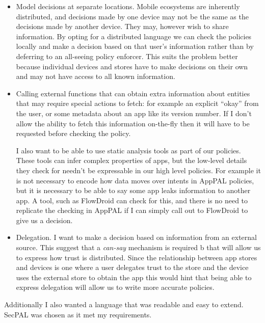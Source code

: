 \documentclass[thesis.tex]{subfiles}
\begin{document}
\begin{itemize}
  \item Model decisions at separate locations.  Mobile ecosystems are
    inherently distributed, and decisions made by one device may not be
    the same as the decisions made by another device.  They may, however
    wish to share information.  By opting for a distributed language we
    can check the policies locally and make a decision based on that
    user's information rather than by deferring to an all-seeing policy
    enforcer.  This suits the problem better because individual devices
    and stores have to make decisions on their own and may not have access
    to all known information.

  \item Calling external functions that can obtain extra information
    about entities that may require special actions to fetch: for example
    an explicit ``okay'' from the user, or some metadata about an app like
    its version number.  If I don't allow the ability to fetch this
    information on-the-fly then it will have to be requested before
    checking the policy.

    I also want to be able to use static analysis tools as part of
    our policies.  These tools can infer complex properties of apps, but
    the low-level details they check for needn't be expressable in our
    high level policies.  For example it is not necessary to encode how
    data moves over intents in AppPAL policies, but it is necessary to be
    able to say some app leaks information to another app.  A tool, such
    as FlowDroid can check for this, and there is no need to replicate the
    checking in AppPAL if I can simply call out to FlowDroid to give us a
    decision.

  \item Delegation.  I want to make a decision based on information from an
    external source.  This suggest that a \emph{can-say} mechanism is required
    b
    that will allow us to express how trust is distributed.   Since the
    relationship between app stores and devices is one where a user delegates
    trust to the store and the device uses the external store to obtain the app
    this would hint that being able to express delegation will allow us to write
    more accurate policies.
\end{itemize}

Additionally I also wanted a language that was readable and easy to extend.
SecPAL was chosen as it met my requirements.
\end{document}
